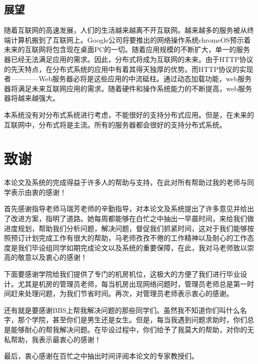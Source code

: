 \documentclass[twoside, xetex]{report}
\begin{document}
\section{展望}
	随着互联网的高速发展，人们的生活越来越离不开互联网。越来越多的服务被从终端计算机搬到了互联网上。Google公司将要推出的网络操作系统chromeOS预示着未来的互联网将包含现在桌面PC的一切。随着应用规模的不断扩大，单一的服务器已经无法满足应用的需求。因此，分布式将成为互联网的未来。由于HTTP协议的先天特点，在分布式系统的应用中有着其得天独厚的优势。而HTTP协议的实现者————Web服务器必将是这些应用的中流砥柱。通过动态加载功能，web服务器将满足未来互联网应用的需求。随着硬件和操作系统能力的不断提高，web服务器将越来越强大。
	
	本系统没有对分布式系统进行考虑，不能很好的支持分布式应用。但是，在未来的互联网中，分布式将是主流。所有的服务器都会很好的支持分布式系统。

\titleformat{\chapter}{\center \three \bf}{}{1em}{}

\chapter{致谢}

本论文及系统的完成得益于许多人的帮助与支持，在此对所有帮助过我的老师与同学表示由衷的感谢！

首先感谢指导老师马瑞芳老师的辛勤指导，对本论文及系统提出了许多意见并给出了改进方案，指明了道路。她每周都能够在白忙之中抽出一早晨时间，来给我们做进度规划，帮助我们分析问题，解决问题，督促我们抓紧时间，这对于我们能够按照预订计划完成工作有很大的帮助，马老师孜孜不倦的工作精神以及耐心的工作态度是我们毕设组同学如期完成论文以及系统的重要保障，在此，我对马老师致以崇高的敬意以及衷心的感谢！

下面要感谢学院给我们提供了专门的机房机位，这极大的方便了我们进行毕业设计。尤其是机房的管理员老师，每当机房出现网络问题时，管理员老师总是第一时间赶来处理问题，为我们节省时间。再次，对管理员老师表示衷心的感谢。

还有就是要感谢BBS上帮我解决问题的那些同学们。虽然我不知道你们叫什么名字，那个学院，甚至你们是男生还是女生。但是，每当我遇到问题求助时，你们总是能够耐心的帮我解决问题。在毕设过程中，你们给予了我莫大的帮助，对你的无私帮助，我表示最衷心的感谢！

最后，衷心感谢在百忙之中抽出时间评阅本论文的专家教授们。
\end{document}
